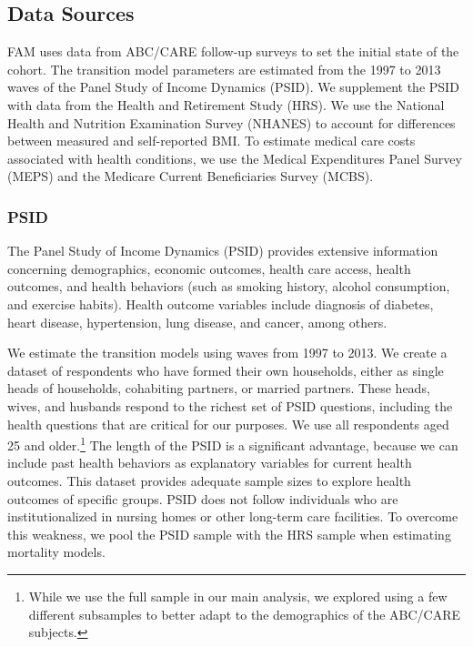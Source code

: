 \subsection{Data Sources} \label{section:data}

\noindent FAM uses data from ABC/CARE follow-up surveys to set the initial state of the cohort.
The transition model parameters are estimated from the 1997 to 2013 waves of the Panel Study of Income Dynamics (PSID).
We supplement the PSID with data from the Health and Retirement Study (HRS). We use the National Health and Nutrition Examination Survey (NHANES)
to account for differences between measured and self-reported BMI.
To estimate medical care costs associated with health conditions, we use the Medical Expenditures Panel Survey (MEPS) and the Medicare Current Beneficiaries Survey (MCBS).


\subsubsection{PSID}
\label{section:data_psid}

\noindent The Panel Study of Income Dynamics (PSID) provides extensive information concerning demographics, economic outcomes, health care access, health outcomes, and health behaviors (such as smoking history, alcohol consumption, and exercise habits). Health outcome variables include diagnosis of diabetes, heart disease, hypertension, lung disease, and cancer, among others.

\noindent We estimate the transition models using waves from 1997 to 2013. We create a dataset of respondents who have formed their own households, either
as single heads of households, cohabiting partners, or married partners. These heads, wives, and husbands respond to the richest
set of PSID questions, including the health questions that are critical for our purposes. We use all respondents aged 25 and older.\footnote{While we use the full sample in our main analysis, we explored using a few different subsamples to better adapt to the demographics of the ABC/CARE subjects.}
The length of the PSID is a significant advantage, because we can include past health behaviors as explanatory variables for current health outcomes. This dataset provides adequate sample sizes to explore health outcomes of specific groups.
PSID does not follow individuals who are institutionalized in nursing homes or other long-term care facilities. To overcome this weakness, we pool the PSID sample with the HRS sample when
estimating mortality models.

